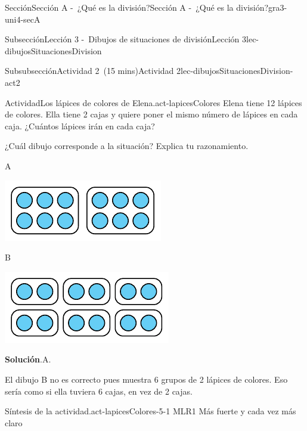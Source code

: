 \documentclass[oneside,10pt,]{article}
\newcommand{\blocktitlefont}{\relax}
\begin{document}
\begin{sectionptx}{Sección}{Sección A -~¿Qué es la división?}{}{Sección A -~¿Qué es la división?}{}{}{gra3-uni4-secA}
\begin{subsectionptx}{Subsección}{Lección 3 -~Dibujos de situaciones de división}{}{Lección 3}{}{}{lec-dibujosSituacionesDivision}
\begin{subsubsectionptx}{Subsubsección}{Actividad 2~(15 mins)}{}{Actividad 2}{}{}{lec-dibujosSituacionesDivision-act2}
\begin{activity}{Actividad}{Los lápices de colores de Elena.}{act-lapicesColores}
Elena tiene 12 lápices de colores. Ella tiene 2 cajas y quiere poner el mismo número de lápices en cada caja. ¿Cuántos lápices irán en cada caja?%
\par
¿Cuál dibujo corresponde a la situación? Explica tu razonamiento.%
\begin{sidebyside}{2}{0}{0}{0}%
\begin{sbspanel}{0.5}%
A%
\par
\includegraphics[width=\linewidth]{external/tikz-source/tikz-file-149310.pdf}
\end{sbspanel}%
\begin{sbspanel}{0.5}%
B%
\par
\includegraphics[width=\linewidth]{external/tikz-source/tikz-file-149311.pdf}
\end{sbspanel}%
\end{sidebyside}%
\par\smallskip%
\noindent\textbf{\blocktitlefont Solución}.\hypertarget{act-lapicesColores-3}{}\quad{}A.%
\par
El dibujo B no es correcto pues muestra 6 grupos de 2 lápices de colores. Eso sería como si ella tuviera 6 cajas, en vez de 2 cajas.%
\end{activity}%
\par
\begin{paragraphs}{Síntesis de la actividad.}{act-lapicesColores-5-1}%
MLR1 Más fuerte y cada vez más claro%
%
\begin{itemize}[label=\textbullet]

\end{itemize}
\end{paragraphs}
\end{subsubsectionptx}
\end{subsectionptx}
\end{sectionptx}
\end{document}

